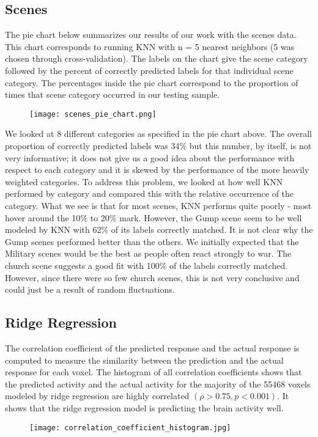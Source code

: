\par
\subsection{Scenes}
The pie chart below summarizes our results of our work with the scenes data. This chart corresponds to running KNN with n = 5 nearest neighbors (5 was chosen through cross-validation). The labels on the chart give the scene category followed by the percent of correctly predicted labels for that individual scene category. The percentages inside the pie chart correspond to the proportion of times that scene category occurred in our testing sample. 
\begin{figure}[H]
 \centering
 \texttt{[image: scenes\_pie\_chart.png]}
  \label{fig:test1}
\end{figure}
\par We looked at 8 different categories as specified in the pie chart above. The overall proportion of correctly predicted labels was 34$\%$ but this number, by itself, is not very informative; it does not give us a good idea about the performance with respect to each category and it is skewed by the performance of the more heavily weighted categories. To address this problem, we looked at  how well KNN performed by category and compared this with the relative occurrence of the category. What we see is that for most scenes, KNN performs quite poorly - most hover around the 10$\%$ to 20$\%$ mark. However, the Gump scene seem to be well modeled by KNN with 62$\%$ of its labels correctly matched. It is not clear why the Gump scenes performed better than the others. We initially expected that the Military scenes would be the best as people often react strongly to war. The church scene suggests a good fit with 100$\%$ of the labels correctly matched. However, since there were so few church scenes, this is not very conclusive and could just be a result of random fluctuations.   

\subsection{Ridge Regression}  
The correlation coefficient of the predicted response and the actual response is computed to measure the similarity between the prediction and the actual response for each voxel. The histogram of all correlation coefficients shows that the predicted activity and the actual activity for the majority of the 55468 voxels modeled by ridge regression are highly correlated $(\rho>0.75, p<0.001)$. It shows that the ridge regression model is predicting the brain activity well.
\begin{figure}[H]
 \centering
 \texttt{[image: correlation\_coefficient\_histogram.jpg]}
  \label{fig:cc}
\end{figure}


